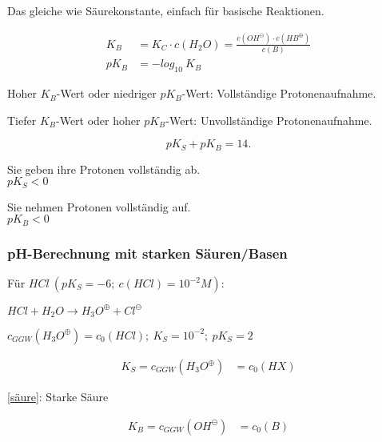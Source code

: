 \begin{definition}[Basenkonstante]
	Das gleiche wie Säurekonstante, einfach für basische Reaktionen.
	
	{\large
		\begin{equation}
		\begin{split}
		K_B & =K_C \cdot c(H_2O) = \frac{c(OH^\ominus) \cdot c(HB^\oplus)}{c(B)} \\
		pK_B & = -log_{10}\ K_B
		\end{split}
		\end{equation}
	}
	
	Hoher $K_B$-Wert oder niedriger $pK_B$-Wert: Vollständige Protonenaufnahme.
	
	Tiefer $K_B$-Wert oder hoher $pK_B$-Wert: Unvollständige Protonenaufnahme.
\end{definition}

{\large
\begin{equation}
	pK_S + pK_B = 14.
\end{equation}
}

\begin{definition}
	Sie geben ihre Protonen vollständig ab. \\
	{\large $pK_S < 0$}
\end{definition}

\begin{definition}
	Sie nehmen  Protonen vollständig auf. \\
	{\large $pK_B < 0$}
\end{definition}

\subsubsection{pH-Berechnung mit starken Säuren/Basen}

Für $HCl\ (pK_S=-6; \ c(HCl) = 10^{-2} M)$:

$HCl + H_2O \rightarrow H_3O^\oplus + Cl^\ominus$

$c_{GGW}(H_3O^\oplus) = c_0(HCl); \ K_S = 10^{-2}; \ pK_S = 2$

{\large
	\begin{equation}
	\label{säure}
		\begin{split}
			 K_S=c_{GGW}(H_3O^\oplus) &= c_0(HX)
		\end{split}
	\end{equation}	
}

\ref{säure}: Starke Säure

{\large
	\begin{equation}
	\label{base}
	\begin{split}
	K_B=c_{GGW}(OH^\ominus) &= c_0(B)
	\end{split}
	\end{equation}	
}

